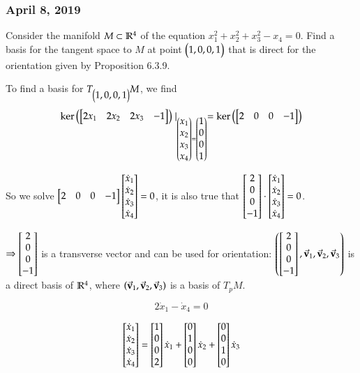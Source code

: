 \subsubsection*{April 8, 2019}

 Consider the manifold $M \subset \mathbb{R}^4$ of the equation $x_1^2 + x_2^2 + x_3^2 - x_4 = 0$. Find a basis for the tangent space to $M$ at point $\begin{pmatrix} 1, 0, 0, 1 \end{pmatrix}$ that is direct for the orientation given by Proposition 6.3.9. 

To find a basis for $T_{\begin{pmatrix} 1, 0, 0, 1 \end{pmatrix}}M$, we find
\[\mathrm{ker} \left( \begin{bmatrix} 2x_1 & 2x_2 & 2x_3 & -1 \end{bmatrix} \right)\mid_{\begin{pmatrix} x_1 \\ x_2 \\ x_3 \\ x_4 \end{pmatrix}=\begin{pmatrix} 1 \\ 0 \\ 0 \\ 1 \end{pmatrix}} = \mathrm{ker} \left( \begin{bmatrix} 2 & 0 & 0 & -1 \end{bmatrix} \right)\]

So we solve $\begin{bmatrix} 2 & 0 & 0 & -1 \end{bmatrix}\begin{bmatrix} \dot{x}_1 \\ \dot{x}_2 \\ \dot{x}_3 \\ \dot{x}_4 \end{bmatrix}=0$, it is also true that $\begin{bmatrix} 2 \\ 0 \\ 0 \\ -1 \end{bmatrix}\cdot \begin{bmatrix} \dot{x}_1 \\ \dot{x}_2 \\ \dot{x}_3 \\ \dot{x}_4 \end{bmatrix}=0$. 

$\Rightarrow \begin{bmatrix} 2 \\ 0 \\ 0 \\ -1 \end{bmatrix}$ is a transverse vector and can be used for orientation: $\left( \begin{bmatrix} 2 \\ 0 \\ 0 \\ -1 \end{bmatrix}, \vec{\textbf{v}}_1, \vec{\textbf{v}}_2, \vec{\textbf{v}}_3 \right)$ is a direct basis of $\mathbb{R}^4$, where $\left( \vec{\textbf{v}}_1, \vec{\textbf{v}}_2, \vec{\textbf{v}}_3 \right)$ is a basis of $T_p M$. 

\[2\dot{x}_1 - \dot{x}_4=0\]

\[\begin{bmatrix} \dot{x}_1 \\ \dot{x}_2 \\ \dot{x}_3 \\ \dot{x}_4 \end{bmatrix} = \begin{bmatrix} 1 \\ 0 \\ 0 \\ 2 \end{bmatrix}\dot{x}_1 + \begin{bmatrix} 0 \\ 1 \\ 0 \\ 0 \end{bmatrix}\dot{x}_2 + \begin{bmatrix} 0 \\ 0 \\ 1 \\ 0 \end{bmatrix}\dot{x}_3\]

